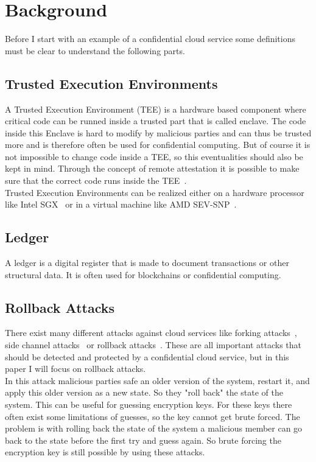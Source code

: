 \section{Background}
Before I start with an example of a confidential cloud service some definitions must be clear to understand the following parts.
\subsection{Trusted Execution Environments}
A Trusted Execution Environment (TEE) is a hardware based component where critical code can be runned inside a trusted part that is called enclave. The code inside this Enclave is hard to modify by malicious parties and can thus be trusted more and is therefore often be used for confidential computing.  But of course it is not impossible to change code inside a TEE, so this eventualities should also be kept in mind. Through the concept of remote attestation it is possible to make sure that the correct code runs inside the TEE~\cite{remoteAttestation}. \\ %
Trusted Execution Environments can be realized either on a hardware processor like Intel SGX~\cite{sgx} or in a virtual machine like AMD SEV-SNP~\cite{amd}.%
\subsection{Ledger}
A ledger is a digital register that is made to document transactions or other structural data. It is often used for blockchains or confidential computing.
\subsection{Rollback Attacks}
There exist many different attacks against cloud services like forking attacks~\cite{forkingAttacks}, side channel attacks~\cite{sideChannel} or rollback attacks~\cite{Rollback}. These are all important attacks that should be detected and protected by a confidential cloud service, but in this paper I will focus on rollback attacks.\\
In this attack malicious parties safe an older version of the system, restart it, and apply this older version as a new state. So they "roll back" the state of the system. This can be useful for guessing encryption keys. For these keys there often exist some limitations of guesses, so the key cannot get brute forced. The problem is with rolling back the state of the system a malicious member can go back to the state before the first try and guess again. So brute forcing the encryption key is still possible by using these attacks. 